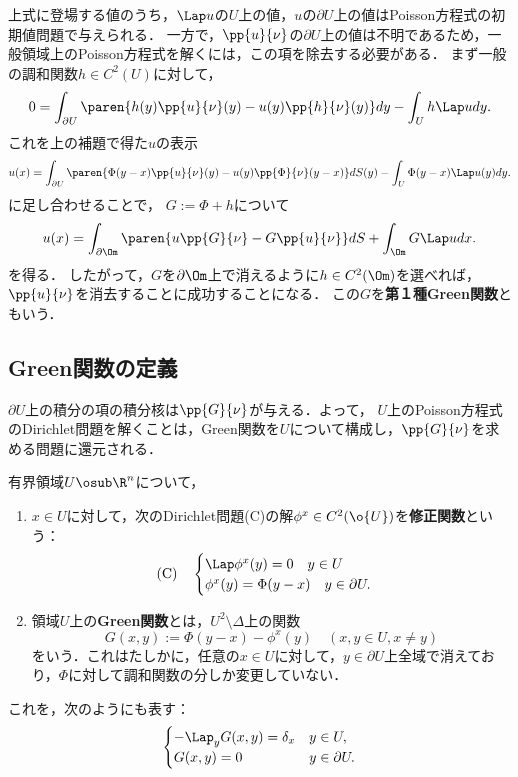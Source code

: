 \documentclass[uplatex,dvipdfmx]{jsreport}
\begin{document}
\begin{observation}[調和関数の和として解作用素を得る]
    上式に登場する値のうち，$\Lap u$の$U$上の値，$u$の$\partial U$上の値はPoisson方程式の初期値問題で与えられる．
    一方で，$\pp{u}{\nu}$の$\partial U$上の値は不明であるため，一般領域上のPoisson方程式を解くには，この項を除去する必要がある．
    まず一般の調和関数$h\in C^2(U)$に対して，
    \[0=\int_{\partial U}\paren{h(y)\pp{u}{\nu}(y)-u(y)\pp{h}{\nu}(y)}dy-\int_Uh\Lap udy.\]
    これを上の補題で得た$u$の表示
    \[u(x)=\int_{\partial U}\paren{\Phi(y-x)\pp{u}{\nu}(y)-u(y)\pp{\Phi}{\nu}(y-x)}dS(y)-\int_U\Phi(y-x)\Lap u(y)dy.\]
    に足し合わせることで，
    $G:=\Phi+h$について
    \[u(x)=\int_{\partial\Om}\paren{u\pp{G}{\nu}-G\pp{u}{\nu}}dS+\int_\Om G\Lap udx.\]
    を得る．
    したがって，$G$を$\partial\Om$上で消えるように$h\in C^2(\Om)$を選べれば，$\pp{u}{\nu}$を消去することに成功することになる．
    この$G$を\textbf{第１種Green関数}ともいう．
\end{observation}

\subsection{Green関数の定義}

\begin{tcolorbox}[colframe=ForestGreen, colback=ForestGreen!10!white,breakable,colbacktitle=ForestGreen!40!white,coltitle=black,fonttitle=\bfseries\sffamily,
    title=]
    $\partial U$上の積分の項の積分核は$\pp{G}{\nu}$が与える．よって，
    $U$上のPoisson方程式のDirichlet問題を解くことは，Green関数を$U$について構成し，$\pp{G}{\nu}$を求める問題に還元される．
\end{tcolorbox}

\begin{definition}
    有界領域$U\osub\R^n$について，
    \begin{enumerate}
        \item $x\in U$に対して，次のDirichlet問題(C)の解$\phi^x\in C^2(\o{U})$を\textbf{修正関数}という：
        \[\text{(C)}\quad\begin{cases}
            \Lap\phi^x(y)=0\quad y\in U\\
            \phi^x(y)=\Phi(y-x)\quad y\in\partial U.
        \end{cases}\]
        \item 領域$U$上の\textbf{Green関数}とは，$U^2\setminus\Delta$上の関数
        \[G(x,y):=\Phi(y-x)-\phi^x(y)\quad(x,y\in U,x\ne y)\]
        をいう．これはたしかに，任意の$x\in U$に対して，$y\in\partial U$上全域で消えており，$\Phi$に対して調和関数の分しか変更していない．
    \end{enumerate}
\end{definition}
\begin{remarks}
    これを，次のようにも表す：
    \[\begin{cases}
        -\Lap_y G(x,y)=\delta_x& y\in U,\\
        G(x,y)=0& y\in \partial U.
    \end{cases}\]
\end{remarks}
\end{document}
